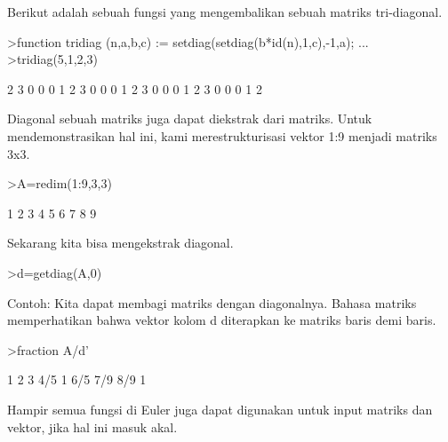 \documentclass[a4paper,10pt]{article}
\begin{document}
\begin{eulernotebook}
\begin{eulercomment}
Berikut adalah sebuah fungsi yang mengembalikan sebuah matriks
tri-diagonal.
\end{eulercomment}
\begin{eulerprompt}
>function tridiag (n,a,b,c) := setdiag(setdiag(b*id(n),1,c),-1,a); ...
>tridiag(5,1,2,3)
\end{eulerprompt}
\begin{euleroutput}
              2             3             0             0             0 
              1             2             3             0             0 
              0             1             2             3             0 
              0             0             1             2             3 
              0             0             0             1             2 
\end{euleroutput}
\begin{eulercomment}
Diagonal sebuah matriks juga dapat diekstrak dari matriks. Untuk
mendemonstrasikan hal ini, kami merestrukturisasi vektor 1:9 menjadi
matriks 3x3.
\end{eulercomment}
\begin{eulerprompt}
>A=redim(1:9,3,3)
\end{eulerprompt}
\begin{euleroutput}
              1             2             3 
              4             5             6 
              7             8             9 
\end{euleroutput}
\begin{eulercomment}
Sekarang kita bisa mengekstrak diagonal.
\end{eulercomment}
\begin{eulerprompt}
>d=getdiag(A,0)
\end{eulerprompt}
\begin{euleroutput}
  [1,  5,  9]
\end{euleroutput}
\begin{eulercomment}
Contoh: Kita dapat membagi matriks dengan diagonalnya. Bahasa matriks
memperhatikan bahwa vektor kolom d diterapkan ke matriks baris demi
baris.
\end{eulercomment}
\begin{eulerprompt}
>fraction A/d'
\end{eulerprompt}
\begin{euleroutput}
          1         2         3 
        4/5         1       6/5 
        7/9       8/9         1 
\end{euleroutput}
\begin{eulercomment}
Hampir semua fungsi di Euler juga dapat digunakan untuk input matriks
dan vektor, jika hal ini masuk akal.


\end{eulercomment}
\end{eulernotebook}
\end{document}
